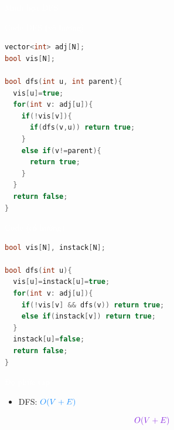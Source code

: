 \documentclass{beamer}
\newcommand{\hlblue}[1]{\textcolor{myblue}{#1}}
\newcommand{\hlred}[1]{\textcolor{myred}{#1}}
\newcommand{\hlpurple}[1]{\textcolor{mypurple}{#1}}
\newcommand{\hlcyan}[1]{\textcolor{mycyan}{#1}}
\newcommand{\hlwhite}[1]{\textcolor{white}{#1}}
\begin{document}
\begin{frame}{\hlwhite{Minh họa DFS}}
\centering
{}
\end{frame}

\begin{frame}[fragile]{\hlwhite{Code DFS (vô hướng)}}
\begin{lstlisting}[language=C++]
vector<int> adj[N];
bool vis[N];

bool dfs(int u, int parent){
  vis[u]=true;
  for(int v: adj[u]){
    if(!vis[v]){
      if(dfs(v,u)) return true;
    }
    else if(v!=parent){
      return true;
    }
  }
  return false;
}
\end{lstlisting}
\end{frame}

\begin{frame}[fragile]{\hlwhite{Code (có hướng)}}
\begin{lstlisting}[language=C++]
bool vis[N], instack[N];

bool dfs(int u){
  vis[u]=instack[u]=true;
  for(int v: adj[u]){
    if(!vis[v] && dfs(v)) return true;
    else if(instack[v]) return true;
  }
  instack[u]=false;
  return false;
}
\end{lstlisting}
\end{frame}

\begin{frame}{\hlwhite{Độ phức tạp}}
\begin{itemize}
\item DFS: \(\hlblue{O(V+E)}\)
\end{itemize}

\medskip
\[
\hlpurple{O(V+E)}
\]
\end{frame}
\end{document}
